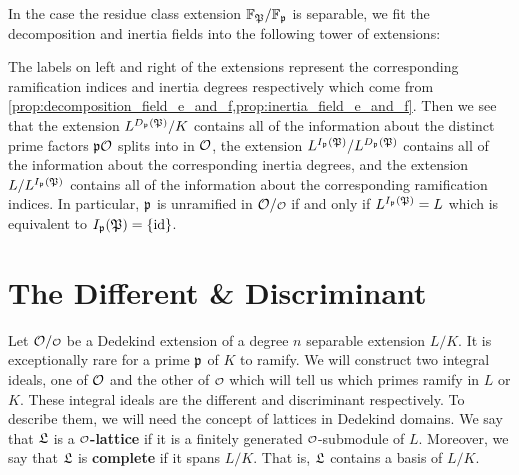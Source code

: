     In the case the residue class extension $\mathbb{F}_{\mathfrak{P}}/\mathbb{F}_{\mathfrak{p}}$ is separable, we fit the decomposition and inertia fields into the following tower of extensions:

    \begin{center}
    \end{center}

    The labels on left and right of the extensions represent the corresponding ramification indices and inertia degrees respectively which come from \cref{prop:decomposition_field_e_and_f,prop:inertia_field_e_and_f}. Then we see that the extension $L^{D_{\mathfrak{p}}(\mathfrak{P})}/K$ contains all of the information about the distinct prime factors $\mathfrak{p}\mathcal{O}$ splits into in $\mathcal{O}$, the extension $L^{I_{\mathfrak{p}}(\mathfrak{P})}/L^{D_{\mathfrak{p}}(\mathfrak{P})}$ contains all of the information about the corresponding inertia degrees, and the extension $L/L^{I_{\mathfrak{p}}(\mathfrak{P})}$ contains all of the information about the corresponding ramification indices. In particular, $\mathfrak{p}$ is unramified in $\mc{O}/\smc{O}$ if and only if $L^{I_{\mathfrak{p}}(\mathfrak{P})} = L$ which is equivalent to $I_{\mathfrak{p}}(\mathfrak{P}) = \{\operatorname{\textrm{id}}\}$.
  \section{The Different \& Discriminant}
    Let $\mc{O}/\smc{O}$ be a Dedekind extension of a degree $n$ separable extension $L/K$. It is exceptionally rare for a prime $\mathfrak{p}$ of $K$ to ramify. We will construct two integral ideals, one of $\mathcal{O}$ and the other of $\smc{O}$ which will tell us which primes ramify in $L$ or $K$. These integral ideals are the different and discriminant respectively. To describe them, we will need the concept of lattices in Dedekind domains. We say that $\mathfrak{L}$ is a \textbf{$\smc{O}$-lattice} if it is a finitely generated $\smc{O}$-submodule of $L$. Moreover, we say that $\mathfrak{L}$ is \textbf{complete} if it spans $L/K$. That is, $\mathfrak{L}$ contains a basis of $L/K$.

